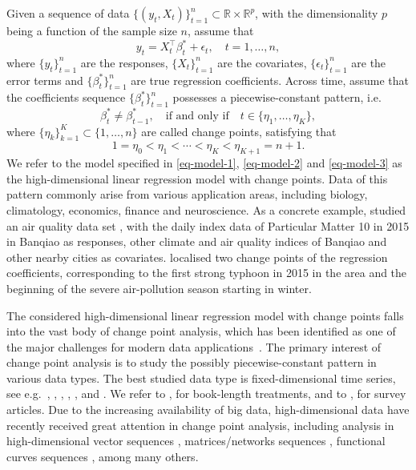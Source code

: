 \documentclass[11pt]{article}
\theoremstyle{plain}
\theoremstyle{definition}
\begin{document}
Given a sequence of data $\{(y_t, X_t)\}_{t = 1}^n \subset \mathbb{R} \times \mathbb{R}^p$, with the dimensionality $p$ being a function of the sample size $n$, assume that 
\begin{equation}\label{eq-model-1}
  y_t = X_t^{\top}\beta_t^* + \epsilon_t, \quad t = 1, \dots, n, 
\end{equation}
where $\{y_t\}_{t = 1}^n$ are the responses, $\{X_t\}_{t = 1}^n$ are the covariates, $\{\epsilon_t\}_{t = 1}^n$ are the error terms and $\{\beta^*_t\}_{t = 1}^n$ are true regression coefficients.  Across time, assume that the coefficients sequence $\{\beta^*_t\}_{t = 1}^n$ possesses a piecewise-constant pattern, i.e.
\begin{equation}\label{eq-model-2}
    \beta^*_t \neq \beta^*_{t-1}, \quad \mbox{if and only if} \quad t \in \{\eta_1, \ldots, \eta_K\},
\end{equation}
where $\{\eta_k\}_{k = 1}^K \subset \{1, \ldots, n\}$ are called change points, satisfying that 
\begin{equation}\label{eq-model-3}
    1 = \eta_0 < \eta_1 < \cdots < \eta_K < \eta_{K+1} = n+1. 
\end{equation}
We refer to the model specified in \eqref{eq-model-1}, \eqref{eq-model-2} and \eqref{eq-model-3} as the high-dimensional linear regression model with change points.  Data of this pattern commonly arise from various application areas, including  biology, climatology, economics, finance and neuroscience.   As a concrete example, \cite{rinaldo2021localizing} studied an air quality data set \citep{data-set}, with the daily index data of Particular Matter 10 in 2015 in Banqiao as responses, other climate and air quality indices of Banqiao and other nearby cities as covariates.  \cite{rinaldo2021localizing} localised two change points of the regression coefficients, corresponding to the first strong typhoon in 2015 in the area and the beginning of the severe air-pollution season starting in winter.

The considered high-dimensional linear regression model with change points falls into the vast body of change point analysis, which has been identified as one of the major challenges for modern data applications~\citep{Council2013}.  The primary interest of change point analysis is to study the possibly piecewise-constant pattern in various data types. The best studied data type is fixed-dimensional time series, see e.g.~\cite{yao1988estimating}, \cite{yao1989least}, \cite{shao2010testing}, \cite{cao2015changepoint}, \cite{wang2020univariate}, \cite{verzelen2020optimal} and \cite{wang2021testing}.  We refer to \cite{Csoergoe1997}, \cite{brodsky2013nonparametric} for book-length treatments, and to \cite{aue:13}, \cite{Casini2019structural} for survey articles.  Due to the increasing availability of big data, high-dimensional data have recently received great attention in change point analysis, including analysis in high-dimensional vector sequences \citep[e.g.][]{wang2021optimal, pilliat2020optimal}, matrices/networks sequences \citep[e.g.][]{bhattacharjee2018change, wang2021optimal}, functional curves sequences \citep[e.g.][]{berkes2009detecting, aue2018detecting, misael2022change}, among many others. 
\end{document}

